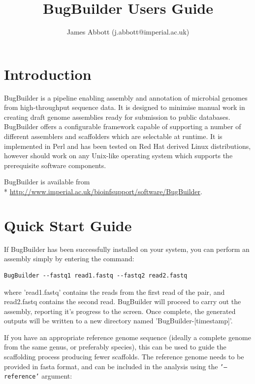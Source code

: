\documentclass[a4paper,twoside,10pt]{article}
\title{BugBuilder Users Guide}
\author{James Abbott (j.abbott@imperial.ac.uk)}
\begin{document}
\maketitle
\tableofcontents
\newpage
\graphicspath{ {images/} }

\section{Introduction}

BugBuilder is a pipeline enabling assembly and annotation of microbial genomes from
high-throughput sequence data. It is designed to minimise manual work in creating draft genome
assemblies ready for submission to public databases. BugBuilder offers a configurable framework
capable of supporting a number of different assemblers and scaffolders which are selectable at
runtime. It is implemented in Perl and has been tested on Red Hat derived Linux distributions,
however should work on any Unix-like operating system which supports the prerequisite software
components.


BugBuilder is available from \\*
\url{http://www.imperial.ac.uk/bioinfsupport/software/BugBuilder}. 

\section{Quick Start Guide}

If BugBuilder has been successfully installed on your system, you can perform an assembly simply by
entering the command:

\begin{verbatim}
BugBuilder --fastq1 read1.fastq --fastq2 read2.fastq
\end{verbatim}

where 'read1.fastq' contains the reads from the first read of the pair, and read2.fastq contains
the second read.  BugBuilder will proceed to carry out the assembly, reporting it's progress to the
screen. Once complete, the generated outputs will be written to a new directory named
'BugBuilder-[timestamp]'.

If you have an appropriate reference genome sequence (ideally a complete genome from the same
genus, or preferably species), this can be used to guide the scaffolding process producing fewer
scaffolds. The reference genome needs to be provided in fasta format, and can be included in the
analysis using the {\tt '--reference'} argument:
\end{document}
